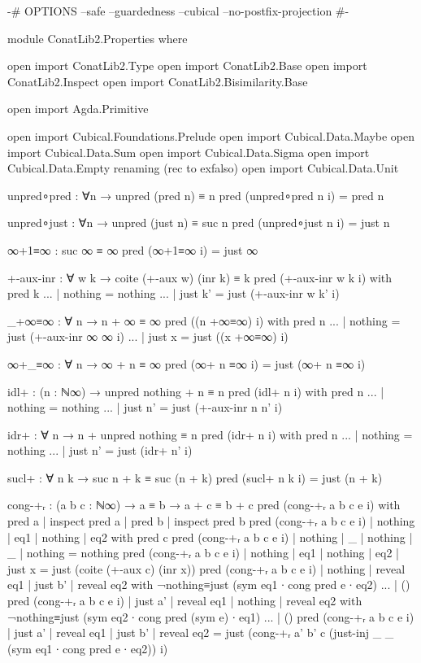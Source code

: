 \begin{code}
{-# OPTIONS --safe --guardedness --cubical --no-postfix-projection #-}

module ConatLib2.Properties where

open import ConatLib2.Type
open import ConatLib2.Base
open import ConatLib2.Inspect
open import ConatLib2.Bisimilarity.Base

open import Agda.Primitive

open import Cubical.Foundations.Prelude
open import Cubical.Data.Maybe
open import Cubical.Data.Sum
open import Cubical.Data.Sigma
open import Cubical.Data.Empty
  renaming (rec to exfalso)
open import Cubical.Data.Unit

unpred∘pred : ∀{n} → unpred (pred n) ≡ n
pred (unpred∘pred {n} i) = pred n


unpred∘just : ∀{n} → unpred (just n) ≡ suc n
pred (unpred∘just {n} i) = just n

∞+1≡∞ : suc ∞ ≡ ∞
pred (∞+1≡∞ i) = just ∞

+-aux-inr : ∀ w k → coite (+-aux w) (inr k) ≡ k
pred (+-aux-inr w k i) with pred k
... | nothing = nothing
... | just k' = just (+-aux-inr w k' i)

_+∞≡∞ : ∀ n → n + ∞ ≡ ∞
pred ((n +∞≡∞) i) with pred n
... | nothing = just (+-aux-inr ∞ ∞ i)
... | just x = just ((x +∞≡∞) i)

∞+_≡∞ : ∀ n → ∞ + n ≡ ∞
pred (∞+ n ≡∞ i) = just (∞+ n ≡∞ i)

idl+ : (n : ℕ∞) → unpred nothing + n ≡ n
pred (idl+ n i) with pred n
... | nothing = nothing
... | just n' = just (+-aux-inr n n' i)

idr+ : ∀ n → n + unpred nothing ≡ n
pred (idr+ n i) with pred n
... | nothing = nothing
... | just n' = just (idr+ n' i)

sucl+ : ∀ n k → suc n + k ≡ suc (n + k)
pred (sucl+ n k i) = just (n + k)

cong-+ᵣ : (a b c : ℕ∞) → a ≡ b → a + c ≡ b + c
pred (cong-+ᵣ a b c e i) with pred a | inspect pred a | pred b | inspect pred b
pred (cong-+ᵣ a b c e i) | nothing | eq1 | nothing | eq2 with pred c
pred (cong-+ᵣ a b c e i) | nothing | _   | nothing | _   | nothing = nothing
pred (cong-+ᵣ a b c e i) | nothing | eq1 | nothing | eq2 | just x = just (coite (+-aux c) (inr x))
pred (cong-+ᵣ a b c e i) | nothing | reveal eq1 | just b' | reveal eq2 with ¬nothing≡just (sym eq1 ∙ cong pred e ∙ eq2)
... | ()
pred (cong-+ᵣ a b c e i) | just a' | reveal eq1 | nothing | reveal eq2 with ¬nothing≡just (sym eq2 ∙ cong pred (sym e) ∙ eq1)
... | ()
pred (cong-+ᵣ a b c e i) | just a' | reveal eq1 | just b' | reveal eq2 = just (cong-+ᵣ a' b' c (just-inj _ _ (sym eq1 ∙ cong pred e ∙ eq2)) i)


\end{code}
